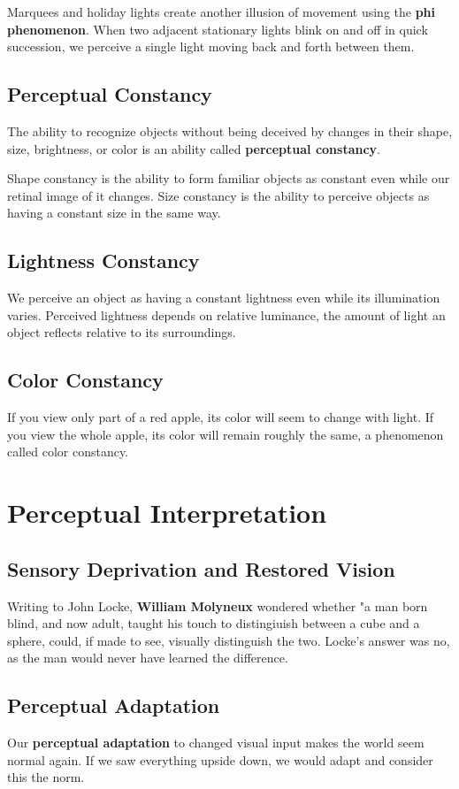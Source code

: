 \documentclass[12pt]{article}
\begin{document}
Marquees and holiday lights create another illusion of movement using the \textbf{phi phenomenon}. When two adjacent stationary lights blink on and off in quick succession, we perceive a single light moving back and forth between them.

\subsection*{Perceptual Constancy}
The ability to recognize objects without being deceived by changes in their shape, size, brightness, or color is an ability called \textbf{perceptual constancy}.

Shape constancy is the ability to form familiar objects as constant even while our retinal image of it changes. Size constancy is the ability to perceive objects as having a constant size in the same way.

\subsection*{Lightness Constancy}
We perceive an object as having a constant lightness even while its illumination varies. Perceived lightness depends on relative luminance, the amount of light an object reflects relative to its surroundings.

\subsection*{Color Constancy}
If you view only part of a red apple, its color will seem to change with light. If you view the whole apple, its color will remain roughly the same, a phenomenon called color constancy.

\section*{Perceptual Interpretation}
\subsection*{Sensory Deprivation and Restored Vision}
Writing to John Locke, {\bf William Molyneux} wondered whether "a man born blind, and now adult, taught his touch to distingiuish between a cube and a sphere, could, if made to see, visually distinguish the two. Locke's answer was no, as the man would never have learned the difference.

\subsection*{Perceptual Adaptation}
Our \textbf{perceptual adaptation} to changed visual input makes the world seem normal again. If we saw everything upside down, we would adapt and consider this the norm.
\end{document}
